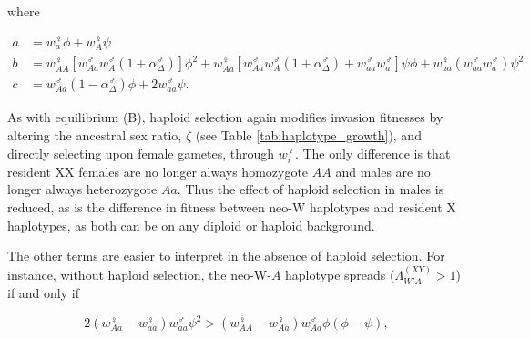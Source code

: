\documentclass[10pt,letterpaper]{article}
\begin{document}
\noindent
where 

\begin{subequations}
\begin{align}
a &= w_a^\female \phi + w_A^\female \psi \\
b &= w_{AA}^\female \left[ w_{Aa}^\male w_A^\male (1+\alpha^\male_\Delta) \right] \phi^2 + w_{Aa}^\female \left[ w_{Aa}^\male w_A^\male (1+\alpha^\male_\Delta) + w_{aa}^\male w_a^\male \right] \psi \phi + w_{aa}^\female \left( w_{aa}^\male w_a^\male \right) \psi^2\\
c &= w_{Aa}^\male (1-\alpha^\male_\Delta) \phi + 2w_{aa}^\male \psi.
\end{align}
\end{subequations}


As with equilibrium (B), haploid selection again modifies invasion fitnesses by altering the ancestral sex ratio, $\zeta$ (see Table \ref{tab:haplotype_growth}), and directly selecting upon female gametes, through $w_{i}^\female$.
The only difference is that resident XX females are no longer always homozygote $AA$ and males are no longer always heterozygote $Aa$.
Thus the effect of haploid selection in males is reduced, as is the difference in fitness between neo-W haplotypes and resident X haplotypes, as both can be on any diploid or haploid background.  

The other terms are easier to interpret in the absence of haploid selection.
For instance, without haploid selection, the neo-W-$A$ haplotype spreads ($\Lambda_{W'A}^{(XY)}>1$) if and only if

\begin{equation}\label{eq:BeqWAspread}
2(w_{Aa}^\female-w_{aa}^\female)w_{aa}^\male \psi^2 > (w_{AA}^\female-w_{Aa}^\female)w_{Aa}^\male \phi (\phi-\psi),
\end{equation}
\end{document}

